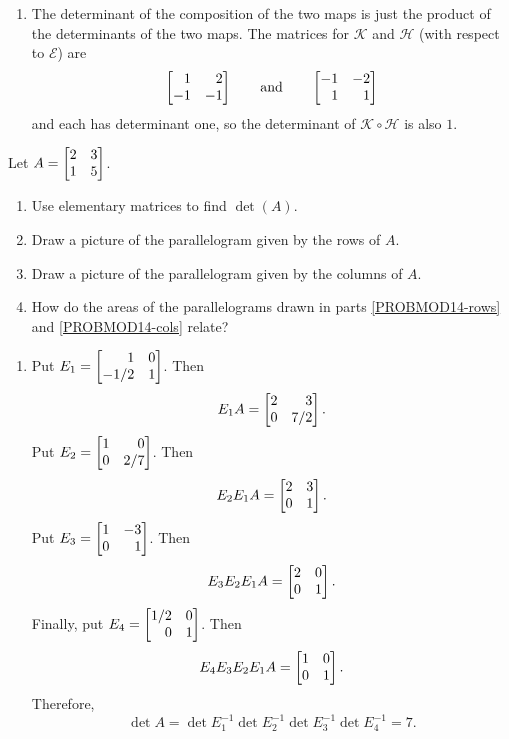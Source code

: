 \begin{exercises}
\begin{problist}
\begin{solution}
\begin{enumerate}
				\item The determinant of the composition of the two maps is just the
					product of the determinants of the two maps. The matrices 
					for $\mathcal K$ and $\mathcal H$ (with respect
					to $\mathcal E$) are
					\[
						\mat{
							1  & 2  \\
							-1 & -1
						}\qquad\text{and}\qquad
						\mat{
							-1 & -2 \\
							1  & 1
						}
					\] and each has determinant one, so the determinant of $\mathcal K\circ\mathcal H$
					is also $1$.
			\end{enumerate}
		\end{solution}

		\prob Let $A=\mat{2&3\\1&5}$.
		\begin{enumerate}
			\item Use elementary matrices to find $\det(A)$.

			\item Draw a picture of the parallelogram given by the rows of $A$.
				\label{PROBMOD14-rows}

			\item Draw a picture of the parallelogram given by the columns of $A$.
				\label{PROBMOD14-cols}

			\item How do the areas of the parallelograms drawn in parts \ref{PROBMOD14-rows}
				and \ref{PROBMOD14-cols} relate?
		\end{enumerate}
		\begin{solution}

			\begin{enumerate}
				\item Put $E_{1} =
					\mat{
						1    & 0 \\
						-1/2 & 1
					}$. Then
					\[
						E_{1} A =
						\mat{
							2 & 3   \\
							0 & 7/2
						}.
					\] Put $E_{2} =
					\mat{
						1 & 0   \\
						0 & 2/7
					}$. Then
					\[
						E_{2} E_{1} A =
						\mat{
							2 & 3 \\
							0 & 1
						}.
					\] Put $E_{3} =
					\mat{
						1 & -3 \\
						0 & 1
					}$. Then
					\[
						E_{3} E_{2} E_{1} A =
						\mat{
							2 & 0 \\
							0 & 1
						}.
					\] Finally, put $E_{4} =
					\mat{
						1/2 & 0 \\
						0   & 1
					}$. Then
					\[
						E_{4} E_{3} E_{2} E_{1} A =
						\mat{
							1 & 0 \\
							0 & 1
						}.
					\] Therefore,
					\[
						\det A = \det E_{1}^{-1}\det E_{2}^{-1}\det E_{3}^{-1}\det E_{4}
						^{-1}= 7.
					\]


\end{enumerate}
\end{solution}
\end{problist}
\end{exercises}
